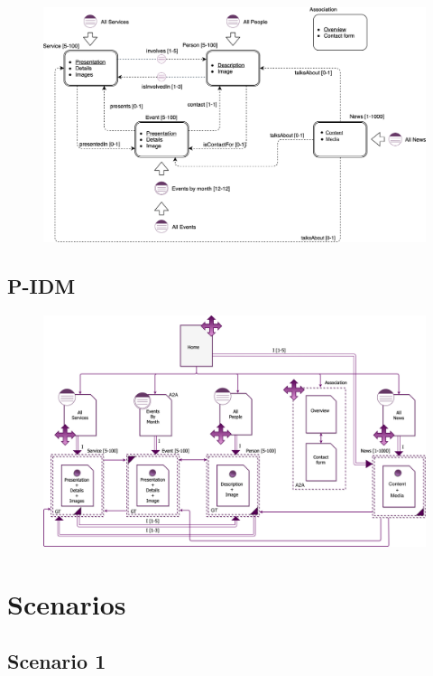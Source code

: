 \documentclass[a4paper, 11pt, parskip=half, headsepline]{scrreprt}
\begin{document}
\begin{figure}[H]
    \centering
    \includegraphics[width=1\linewidth, keepaspectratio]{IDM/L-IDM}
\end{figure}

\newpage
\section{P-IDM}

\begin{figure}[H]
    \centering
    \includegraphics[width=1\linewidth, keepaspectratio]{IDM/P-IDM}
\end{figure}

\chapter{Scenarios}

\section{Scenario 1}
\end{document}
